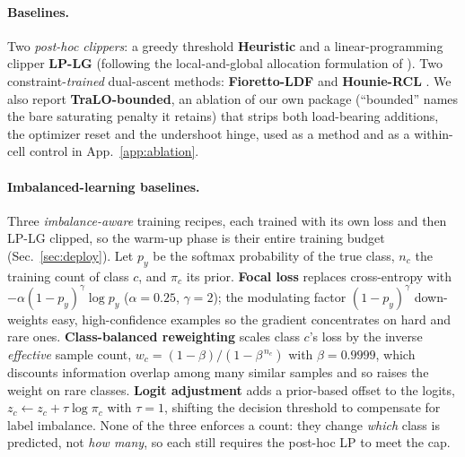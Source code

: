 \documentclass[10pt]{article}
\begin{document}
\paragraph{Baselines.}
Two \emph{post-hoc clippers}: a greedy threshold \textbf{Heuristic} and a
linear-programming clipper \textbf{LP-LG} (following the local-and-global
allocation formulation of \citealt{shifman2025classification}). Two
constraint-\emph{trained} dual-ascent
methods: \textbf{Fioretto-LDF} \citep{fioretto2020lagrangian} and
\textbf{Hounie-RCL} \citep{hounie2023resilient}. We also report
\textbf{TraLO-bounded}, an ablation of our own package (``bounded'' names
the bare saturating penalty it retains) that strips both load-bearing
additions, the optimizer reset and the undershoot hinge, used as a method
and as a within-cell control in App.~\ref{app:ablation}.

{\color{blue}
\paragraph{Imbalanced-learning baselines.}
Three \emph{imbalance-aware} training recipes, each trained with its own loss and then
LP-LG clipped, so the warm-up phase is their entire training budget
(Sec.~\ref{sec:deploy}). Let $p_y$ be the softmax probability of the true class, $n_c$
the training count of class $c$, and $\pi_c$ its prior. \textbf{Focal loss}
\citep{lin2017focal} replaces cross-entropy with
$-\alpha(1-p_y)^{\gamma}\log p_y$ ($\alpha{=}0.25$, $\gamma{=}2$); the modulating factor
$(1-p_y)^{\gamma}$ down-weights easy, high-confidence examples so the gradient
concentrates on hard and rare ones. \textbf{Class-balanced reweighting}
\citep{cui2019class} scales class $c$'s loss by the inverse \emph{effective} sample
count, $w_c = (1-\beta)/(1-\beta^{\,n_c})$ with $\beta{=}0.9999$, which discounts
information overlap among many similar samples and so raises the weight on rare classes.
\textbf{Logit adjustment} \citep{menon2020long} adds a prior-based offset to the logits,
$z_c \leftarrow z_c + \tau\log\pi_c$ with $\tau{=}1$, shifting the decision threshold to
compensate for label imbalance. None of the three enforces a count: they change
\emph{which} class is predicted, not \emph{how many}, so each still requires the post-hoc
LP to meet the cap.}
\end{document}
